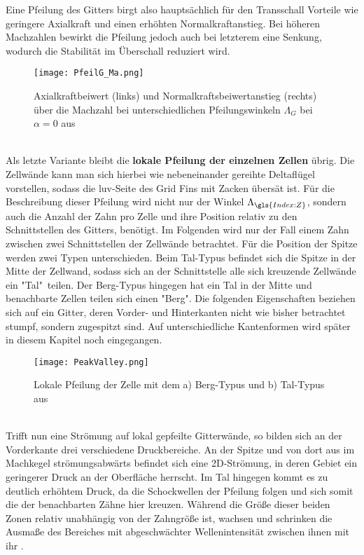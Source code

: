 Eine Pfeilung des Gitters birgt also hauptsächlich für den Transschall Vorteile wie geringere Axialkraft und einen erhöhten Normalkraftanstieg. Bei höheren Machzahlen bewirkt die Pfeilung jedoch auch bei letzterem eine Senkung, wodurch die Stabilität im Überschall reduziert wird.
\begin{figure}[h]
	\centering
	\texttt{[image: PfeilG\_Ma.png]}
	\caption{Axialkraftbeiwert (links) und Normalkraftsbeiwertanstieg (rechts) über die Machzahl bei unterschiedlichen Pfeilungswinkeln $\Lambda_{G}$ bei $\alpha = 0$ aus \cite{PfeilG1}}
\end{figure}\\
Als letzte Variante bleibt die \textbf{lokale Pfeilung der einzelnen Zellen} übrig. Die Zellwände kann man sich hierbei wie nebeneinander gereihte Deltaflügel vorstellen, sodass die luv-Seite des Grid Fins mit Zacken übersät ist. Für die Beschreibung dieser Pfeilung wird nicht nur der Winkel $\Lambda_{\gls{Index:Z}}$, sondern auch die Anzahl der Zahn pro Zelle und ihre Position relativ zu den Schnittstellen des Gitters, benötigt. Im Folgenden wird nur der Fall einem Zahn zwischen zwei Schnittstellen der Zellwände betrachtet. Für die Position der Spitze werden zwei Typen unterschieden. Beim Tal-Typus befindet sich die Spitze in der Mitte der Zellwand, sodass sich an der Schnittstelle alle sich kreuzende Zellwände ein "Tal"\ teilen. Der Berg-Typus hingegen hat ein Tal in der Mitte und benachbarte Zellen teilen sich einen "Berg".
Die folgenden Eigenschaften beziehen sich auf ein Gitter, deren Vorder- und Hinterkanten nicht wie bisher betrachtet stumpf, sondern zugespitzt sind. Auf unterschiedliche Kantenformen wird später in diesem Kapitel noch eingegangen. 
\begin{figure}[h]
	\centering
	\texttt{[image: PeakValley.png]}
	\caption{Lokale Pfeilung der Zelle mit dem a) \grqq Berg\grqq -Typus und b) \grqq Tal\grqq -Typus aus \cite{PeakValley}}
\end{figure}\\
Trifft nun eine Strömung auf lokal gepfeilte Gitterwände, so bilden sich an der Vorderkante drei verschiedene Druckbereiche. An der Spitze und von dort aus im Machkegel strömungsabwärts befindet sich eine 2D-Strömung, in deren Gebiet ein geringerer Druck an der Oberfläche herrscht. Im Tal hingegen kommt es zu deutlich erhöhtem Druck, da die Schockwellen der Pfeilung folgen und sich somit die der benachbarten Zähne hier kreuzen. Während die Größe dieser beiden Zonen relativ unabhängig von der Zahngröße ist, wachsen und schrinken die Ausmaße des Bereiches mit abgeschwächter Wellenintensität zwischen ihnen mit ihr \cite{PeakValley}.

